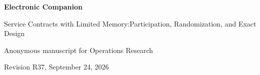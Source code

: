 \documentclass[11pt,letterpaper]{article}
\theoremstyle{definition}\newtheorem{assumption}[theorem]{Assumption}
\begin{document}
\begin{center}{\Large\bfseries Electronic Companion}\par\medskip
{\large Service Contracts with Limited Memory:\newline Participation, Randomization, and Exact Design}\par\medskip Anonymous manuscript for Operations Research\par Revision R37, September 24, 2026\end{center}











\clearpage

\clearpage
\end{document}
